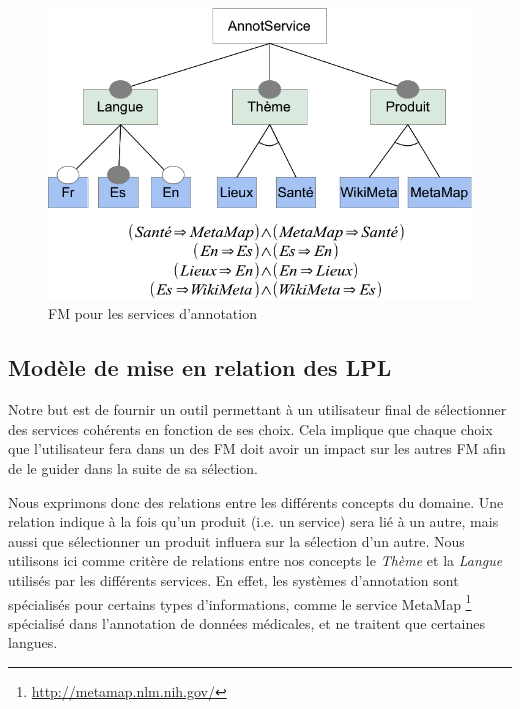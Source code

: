 \documentclass[]{easychair}
\newcommand{\comment}[4]{\par\noindent\hspace*{-0.5cm}{\parbox{\columnwidth}{\textbf{\color{#1}//#2[#3]:#4}}}\par}
\newcommand{\si}[1]{\comment{red}{}{#1}{SI}}
\begin{document}
\begin{figure}[htb!]
	\begin{centering}
	\includegraphics[scale=0.4]{FM.png}
	\caption{FM pour les services d'annotation}
	\label{fig:mmFM}
	\end{centering}
\end{figure}

\subsection{Modèle de mise en relation des LPL}
Notre but est de fournir un outil permettant à un utilisateur final de sélectionner des services cohérents en fonction de ses choix. Cela implique que chaque choix que l'utilisateur fera dans un des FM doit avoir un impact sur les autres FM afin de le guider dans la suite de sa sélection.

Nous exprimons donc des relations entre les différents concepts du domaine. Une relation indique à la fois qu'un produit (i.e. un service) sera lié à un autre, mais aussi que sélectionner un produit influera sur la sélection d'un autre. Nous utilisons ici comme critère de relations entre nos concepts le \textit{Thème} et  la \textit{Langue} utilisés par les différents services. En effet, les systèmes d'annotation sont spécialisés pour certains types d'informations, comme le service MetaMap \footnote{\url{http://metamap.nlm.nih.gov/}} spécialisé dans l'annotation de données médicales, et ne traitent que certaines langues.
\end{document}
